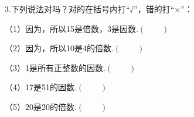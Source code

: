 \question 3.下列说法对吗？对的在括号内打“√”，错的打“×”：

（1）因为，所以15是倍数，3是因数.\hfill$\left(\qquad\right)$

（2）因为，所以10是4的倍数.\hfill$\left(\qquad\right)$

（3）1是所有正整数的因数.\hfill$\left(\qquad\right)$

（4）17是51的因数.\hfill$\left(\qquad\right)$

（5）20是20的倍数.\hfill$\left(\qquad\right)$